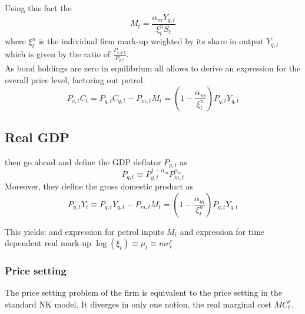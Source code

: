\documentclass[12pt,a4paper,english]{article} %
\begin{document}
	Using this fact the 
	\begin{equation}
		M_t = \frac{\alpha_m Y_{q,t}}{\xi_{t}^n S_t}
	\end{equation}
	where $\xi_t^n$ is the individual firm mark-up weighted by its share in output $Y_{q,t}$ which is given by the ratio of $\frac{P_{i,q,t}}{P_{q,t}}$. \\
	As bond holdings are zero in equilibrium all  allows to derive an expression for the overall price level, factoring out petrol.
	\begin{equation}
		P_{c,t}C_t = P_{q,t} C_{q,t} - P_{m,t}M_t = \left(1 - \frac{\alpha_m}{\xi_t^n} \right) P_{q,t} Y_{q,t}
	\end{equation}
	
	\subsection{Real GDP}
	
	
	

	\cite{blanchard_macroeconomic_2007} then go ahead and define the GDP deflator $P_{y,t}$ as
	\begin{equation}
		P_{q,t} \equiv P_{y,t}^{1-\alpha_m} P_{m,t}^{\alpha_m}
	\end{equation}
	Moreover, they define the gross domestic product as 
	\begin{equation}
		P_{y,t} Y_t \equiv P_{q,t} Y_{q,t} - P_{m,t} M_t = \left( 1 - \frac{\alpha_m}{\xi_t^n} \right) P_{q,t} Y_{q,t}
	\end{equation}
	
	This yields:
	and expression for petrol inputs $M_t$
	and expression for time dependent real mark-up $\log(\xi_t) \equiv \mu_t \equiv mc_t^r$
	
	
	\subsubsection{Price setting}
	The price setting problem of the firm is equivalent to the price setting in the standard NK model. It diverges in only one notion, the real marginal cost $MC_t^r$. \\
	
\end{document}
